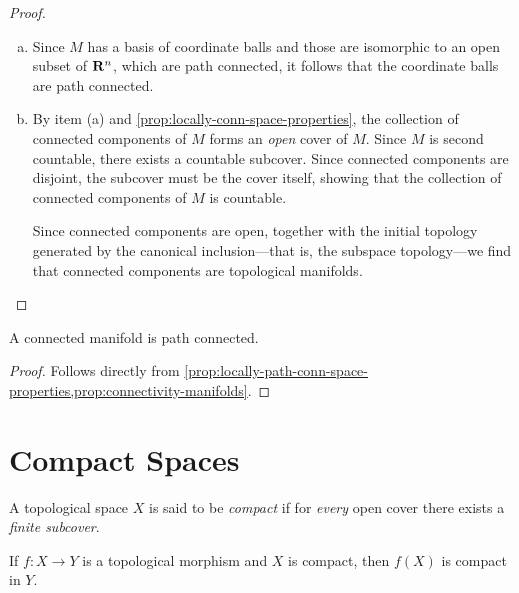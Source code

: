 \begin{proof}
    \begin{enumerate}[(a)]\setlength\itemsep{0em}
        \item Since \(M\) has a basis of coordinate balls and those are isomorphic to an
              open subset of \(\mathbf{R}^n\), which are path connected, it follows that the
              coordinate balls are path connected.

        \item By item (a) and \cref{prop:locally-conn-space-properties}, the collection
              of connected components of \(M\) forms an \emph{open} cover of \(M\). Since
              \(M\) is second countable, there exists a countable subcover. Since connected
              components are disjoint, the subcover must be the cover itself, showing that
              the collection of connected components of \(M\) is countable.

              Since connected components are open, together with the initial topology
              generated by the canonical inclusion---that is, the subspace topology---we
              find that connected components are topological manifolds.
    \end{enumerate}
\end{proof}

\begin{corollary}
    \label{cor:manifold-connected-iff-path-connected}
    A connected manifold is path connected.
\end{corollary}

\begin{proof}
    Follows directly from
    \cref{prop:locally-path-conn-space-properties,prop:connectivity-manifolds}.
\end{proof}

\section{Compact Spaces}

\begin{definition}
    \label{def:compact-space}
    A topological space \(X\) is said to be \emph{compact} if for \emph{every} open
    cover there exists a \emph{finite subcover}.
\end{definition}

\begin{proposition}
    \label{prop:image-of-compact-is-compact}
    If \(f: X \to Y\) is a topological morphism and \(X\) is compact, then \(f(X)\)
    is compact in \(Y\).
\end{proposition}

